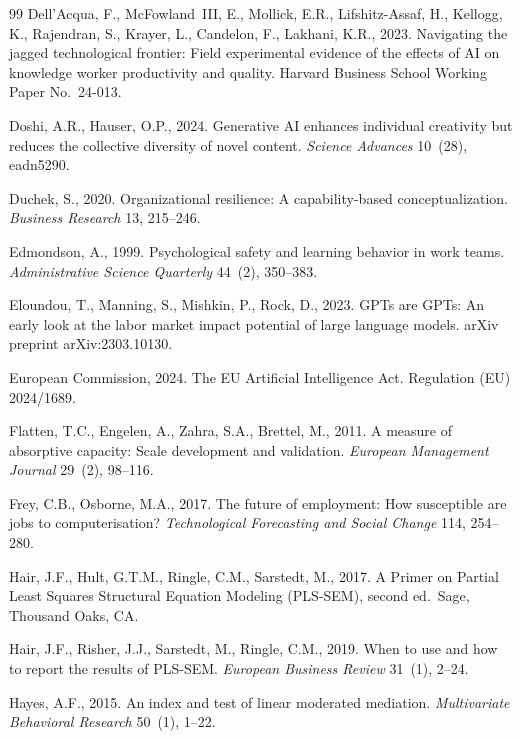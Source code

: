 \documentclass[12pt, a4paper]{article}
\begin{document}
\begin{thebibliography}{99}
Dell'Acqua, F., McFowland~III, E., Mollick, E.R., Lifshitz-Assaf, H., Kellogg, K., Rajendran, S., Krayer, L., Candelon, F., Lakhani, K.R., 2023. Navigating the jagged technological frontier: Field experimental evidence of the effects of AI on knowledge worker productivity and quality. Harvard Business School Working Paper No.\ 24-013.

Doshi, A.R., Hauser, O.P., 2024. Generative AI enhances individual creativity but reduces the collective diversity of novel content. \textit{Science Advances} 10~(28), eadn5290.

Duchek, S., 2020. Organizational resilience: A capability-based conceptualization. \textit{Business Research} 13, 215--246.

Edmondson, A., 1999. Psychological safety and learning behavior in work teams. \textit{Administrative Science Quarterly} 44~(2), 350--383.

Eloundou, T., Manning, S., Mishkin, P., Rock, D., 2023. GPTs are GPTs: An early look at the labor market impact potential of large language models. arXiv preprint arXiv:2303.10130.

European Commission, 2024. The EU Artificial Intelligence Act. Regulation (EU) 2024/1689.

Flatten, T.C., Engelen, A., Zahra, S.A., Brettel, M., 2011. A measure of absorptive capacity: Scale development and validation. \textit{European Management Journal} 29~(2), 98--116.

Frey, C.B., Osborne, M.A., 2017. The future of employment: How susceptible are jobs to computerisation? \textit{Technological Forecasting and Social Change} 114, 254--280.

Hair, J.F., Hult, G.T.M., Ringle, C.M., Sarstedt, M., 2017. A Primer on Partial Least Squares Structural Equation Modeling (PLS-SEM), second ed.\ Sage, Thousand Oaks, CA.

Hair, J.F., Risher, J.J., Sarstedt, M., Ringle, C.M., 2019. When to use and how to report the results of PLS-SEM. \textit{European Business Review} 31~(1), 2--24.

Hayes, A.F., 2015. An index and test of linear moderated mediation. \textit{Multivariate Behavioral Research} 50~(1), 1--22.


\end{thebibliography}
\end{document}
